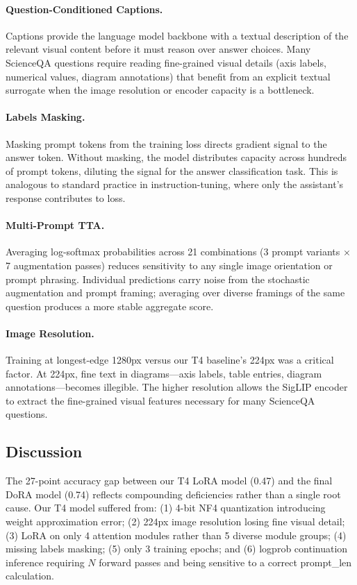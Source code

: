 \documentclass[11pt]{article}
\begin{document}
\paragraph{Question-Conditioned Captions.}
Captions provide the language model backbone with a textual description of the relevant visual content before it must reason over answer choices. Many ScienceQA questions require reading fine-grained visual details (axis labels, numerical values, diagram annotations) that benefit from an explicit textual surrogate when the image resolution or encoder capacity is a bottleneck.

\paragraph{Labels Masking.}
Masking prompt tokens from the training loss directs gradient signal to the answer token. Without masking, the model distributes capacity across hundreds of prompt tokens, diluting the signal for the answer classification task. This is analogous to standard practice in instruction-tuning, where only the assistant's response contributes to loss.

\paragraph{Multi-Prompt TTA.}
Averaging log-softmax probabilities across 21 combinations (3 prompt variants $\times$ 7 augmentation passes) reduces sensitivity to any single image orientation or prompt phrasing. Individual predictions carry noise from the stochastic augmentation and prompt framing; averaging over diverse framings of the same question produces a more stable aggregate score.

\paragraph{Image Resolution.}
Training at longest-edge 1280px versus our T4 baseline's 224px was a critical factor. At 224px, fine text in diagrams---axis labels, table entries, diagram annotations---becomes illegible. The higher resolution allows the SigLIP encoder to extract the fine-grained visual features necessary for many ScienceQA questions.

\subsection{Discussion}

The 27-point accuracy gap between our T4 LoRA model (0.47) and the final DoRA model (0.74) reflects compounding deficiencies rather than a single root cause. Our T4 model suffered from: (1) 4-bit NF4 quantization introducing weight approximation error; (2) 224px image resolution losing fine visual detail; (3) LoRA on only 4 attention modules rather than 5 diverse module groups; (4) missing labels masking; (5) only 3 training epochs; and (6) logprob continuation inference requiring $N$ forward passes and being sensitive to a correct prompt\_len calculation.
\end{document}
